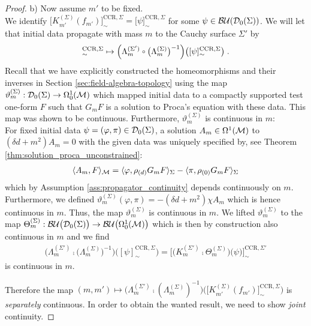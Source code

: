 \begin{proof}
%
%
%
b) Now assume $m'$ to be fixed. \\
We identify $\big[ K_{m'}^{(\Sigma)}(f_{m'}) \big]_\sim^{\text{CCR},\Sigma}= \big[ \psi \big]_\sim^{\text{CCR},\Sigma}$ for some $\psi \in \mathcal{BU}{\left( \mathcal{D}_{0}(\Sigma) \right)}$. We will let that initial data propagate with mass $m$ to the Cauchy surface $\Sigma'$ by
\begin{align}
	[\psi]_\sim^{\text{CCR},\Sigma} \mapsto \Big( \Lambda^{(\Sigma')}_{m} \comp \big( \Lambda^{(\Sigma)}_{m} \big)^{-1} \Big) \big([\psi]_\sim^{\text{CCR},\Sigma}\big) \formspace.
	\end{align}
Recall that we have explicitly constructed the homeomorphisms and their inverses in Section \ref{sec:field-algebra-topology} using the map $\vartheta_m^{(\Sigma)} : \mathcal{D}_{0}(\Sigma)  \to \Omega^1_0(\mathcal{M}) $ which mapped initial data to a compactly supported test one-form $F$ such that $G_m F$ is a solution to Proca's equation with these data. This map was shown to be continuous. Furthermore, $\vartheta_m^{(\Sigma)}$ is continuous in $m$:\\
For fixed initial data $\psi= (\varphi, \pi) \in \mathcal{D}_{0}(\Sigma)$, a solution $A_{m} \in \Omega^1(\mathcal{M})$ to $(\delta d + {m}^2)A_{m} =0$ with the given data was uniquely specified by, see Theorem \ref{thm:solution_proca_unconstrained}:
\begin{align}
	\langle A_{m}, F \rangle_{\mathcal{M}} =  \langle \varphi, \rho_{(d)} G_{m} F \rangle_\Sigma - \langle \pi , \rho_{(0)} G_{m} F \rangle_\Sigma
\end{align}
which by Assumption \ref{ass:propagator_continuity} depends continuously on $m$. Furthermore, we defined $\vartheta_m^{(\Sigma)} (\varphi,\pi) = - (\delta d + {m}^2) \chi A_{m}$ which is hence continuous in $m$. Thus, the map $\vartheta_m^{(\Sigma)}$ is continuous in $m$. We lifted $\vartheta_m^{(\Sigma)}$ to the map $\Theta_m^{(\Sigma)} : \mathcal{BU}\big( \mathcal{D}_{0}(\Sigma)\big) \to {\mathcal{BU}\big(\Omega^1_0(\ensuremath{\mathcal{M}})\big)}$ which is then by construction also continuous in $m$ and we find
\begin{align}
\Big( \Lambda^{(\Sigma')}_{m} \comp \big( \Lambda^{(\Sigma)}_{m} \big)^{-1} \Big) \big( [\psi]_\sim^{\text{CCR},\Sigma} \big) = \big[ \big( K_{m}^{(\Sigma')} \comp  \Theta_{m}^{(\Sigma)}\big) \big( \psi \big) \big]_\sim^{\text{CCR},\Sigma'}
\end{align}
is continuous in $m$.\par
Therefore the map $	(m,m') \mapsto \Big( \Lambda^{(\Sigma')}_m \comp \left( \Lambda^{(\Sigma)}_m \right)^{-1} \Big) \Big(  \big[ K_{m'}^{(\Sigma)}  (f_{m'})\big]_\sim^{\text{CCR}, \Sigma}\Big)$ is \emph{separately} continuous. In order to obtain the wanted result, we need to show \emph{joint} continuity. \par

\end{proof}
